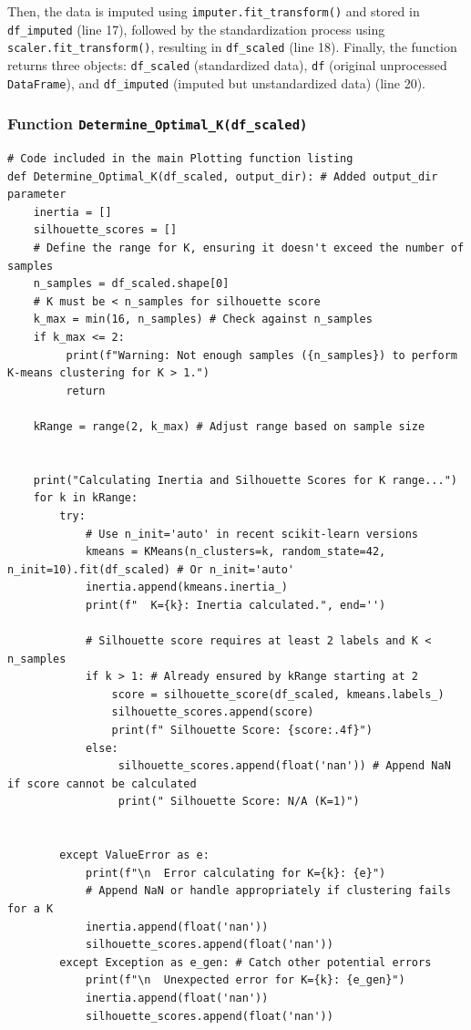 \documentclass[12pt]{report}
\begin{document}
{{{Then, the data is imputed using \texttt{imputer.fit\_transform()} and stored in \texttt{df\_imputed} (line 17), followed by the standardization process using \texttt{scaler.fit\_transform()}, resulting in \texttt{df\_scaled} (line 18). Finally, the function returns three objects: \texttt{df\_scaled} (standardized data), \texttt{df} (original unprocessed \texttt{DataFrame}), and \texttt{df\_imputed} (imputed but unstandardized data) (line 20).
\subsubsection{Function \texttt{Determine\_Optimal\_K(df\_scaled)}} %
\begin{lstlisting}
# Code included in the main Plotting function listing
def Determine_Optimal_K(df_scaled, output_dir): # Added output_dir parameter
    inertia = []
    silhouette_scores = []
    # Define the range for K, ensuring it doesn't exceed the number of samples
    n_samples = df_scaled.shape[0]
    # K must be < n_samples for silhouette score
    k_max = min(16, n_samples) # Check against n_samples
    if k_max <= 2:
         print(f"Warning: Not enough samples ({n_samples}) to perform K-means clustering for K > 1.")
         return

    kRange = range(2, k_max) # Adjust range based on sample size


    print("Calculating Inertia and Silhouette Scores for K range...")
    for k in kRange:
        try:
            # Use n_init='auto' in recent scikit-learn versions
            kmeans = KMeans(n_clusters=k, random_state=42, n_init=10).fit(df_scaled) # Or n_init='auto'
            inertia.append(kmeans.inertia_)
            print(f"  K={k}: Inertia calculated.", end='')

            # Silhouette score requires at least 2 labels and K < n_samples
            if k > 1: # Already ensured by kRange starting at 2
                score = silhouette_score(df_scaled, kmeans.labels_)
                silhouette_scores.append(score)
                print(f" Silhouette Score: {score:.4f}")
            else:
                 silhouette_scores.append(float('nan')) # Append NaN if score cannot be calculated
                 print(" Silhouette Score: N/A (K=1)")


        except ValueError as e:
            print(f"\n  Error calculating for K={k}: {e}")
            # Append NaN or handle appropriately if clustering fails for a K
            inertia.append(float('nan'))
            silhouette_scores.append(float('nan'))
        except Exception as e_gen: # Catch other potential errors
            print(f"\n  Unexpected error for K={k}: {e_gen}")
            inertia.append(float('nan'))
            silhouette_scores.append(float('nan'))



\end{lstlisting}}}}
\end{document}

